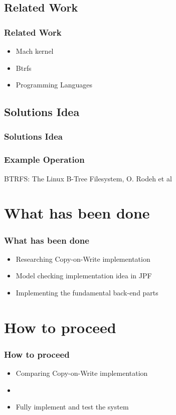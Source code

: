 \documentclass{beamer}
\begin{document}
\subsection{Related Work}
\begin{frame}
  \frametitle{Related Work}
  \begin{itemize}
    \item{Mach kernel}
    \pause
    \item{Btrfs}
    \pause
    \item{Programming Languages}
  \end{itemize}
\end{frame}

\subsection{Solutions Idea}
\begin{frame}
  \frametitle{Solutions Idea}
  \centerline{}
\end{frame}
\begin{frame}
  \frametitle{Example Operation}
  \centerline{}
  \vspace{20pt}
  \centerline{\tiny{BTRFS: The Linux B-Tree Filesystem, O. Rodeh et al}}
\end{frame}

\section{What has been done}
\begin{frame}
  \frametitle{What has been done}
  \begin{itemize}
    \item{Researching Copy-on-Write implementation}
    \pause
    \item{Model checking implementation idea in JPF}
    \pause
    \item{Implementing the fundamental back-end parts}
  \end{itemize}
\end{frame}

\section{How to proceed}

\begin{frame}
  \frametitle{How to proceed}
  \begin{itemize}
    \item{Comparing Copy-on-Write implementation}
    \pause
    \item{}
    \pause
    \item{Fully implement and test the system}
  \end{itemize}
\end{frame}
\end{document}
